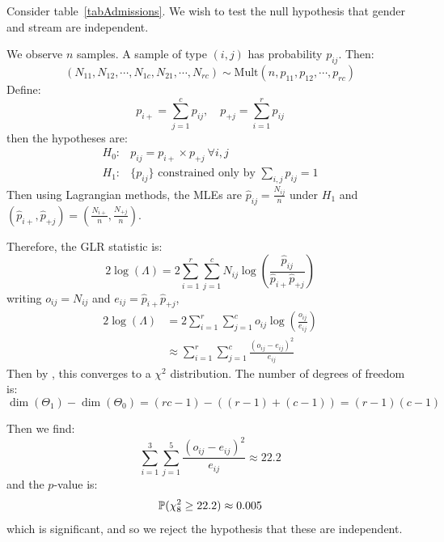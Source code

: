 \documentclass[../Main.tex]{subfiles}
\begin{document}
\begin{example}
    Consider table~\ref{tabAdmissions}. We wish to test the null hypothesis that gender and stream are independent.

    We observe $n$ samples. A sample of type $(i, j)$ has probability $p_{ij}$. Then:
    \begin{equation*}
        (N_{11}, N_{12}, \cdots, N_{1c}, N_{21}, \cdots, N_{rc}) \sim \text{Mult}(n, p_{11}, p_{12}, \cdots, p_{rc})
    \end{equation*}
    Define:
    \begin{equation*}
        p_{i+} = \sum_{j= 1}^{c}p_{ij},\quad p_{+j} = \sum_{i = 1}^{r} p_{ij}
    \end{equation*}
    then the hypotheses are:
    \begin{align*}
        H_0: & p_{ij} = p_{i+} \times p_{+j}~\forall i, j \\
        H_1: & \{p_{ij}\} \text{ constrained only by } \sum_{i, j}p_{ij} = 1
    \end{align*}
    Then using Lagrangian methods, the MLEs are $\hat{p}_{ij} = \frac{N_{ij}}{n}$ under $H_1$ and $(\hat{p}_{i+}, \hat{p}_{+j}) = \left(\frac{N_{i+}}{n}, \frac{N_{+j}}{n}\right)$.

    Therefore, the GLR statistic is:
    \begin{equation*}
        2\log(\Lambda) = 2\sum_{i=1}^{r} \sum_{j=1}^{c} N_{ij} \log\left(\frac{\hat{p}_{ij}}{\hat{p}_{i+} \hat{p}_{+j}}\right)
    \end{equation*}
    writing $o_{ij} = N_{ij}$ and $e_{ij} = \hat{p}_{i+} \hat{p}_{+j}$,
    \begin{align*}
        2\log(\Lambda) &= 2\sum_{i=1}^{r} \sum_{j=1}^{c} o_{ij} \log\left(\frac{o_{ij}}{e_{ij}}\right) \\
        &\approx \sum_{i=1}^{r} \sum_{j=1}^{c} \frac{(o_{ij} - e_{ij})^2}{e_{ij}}
    \end{align*}
    Then by , this converges to a $\chi^2$ distribution. The number of degrees of freedom is:
    \begin{equation*}
        \dim(\Theta_1) - \dim(\Theta_0) = (rc - 1) - ((r - 1) + (c - 1)) = (r-1)(c-1)
    \end{equation*}

    Then we find:
    \begin{equation*}
        \sum_{i=1}^{3} \sum_{j=1}^{5} \frac{(o_{ij} - e_{ij})^2}{e_{ij}} \approx 22.2
    \end{equation*}
    and the $p$-value is:
    \begin{equation*}
        \P(\chi_8^2 \geq 22.2) \approx 0.005
    \end{equation*}
    which is significant, and so we reject the hypothesis that these are independent.
\end{example}
\end{document}
